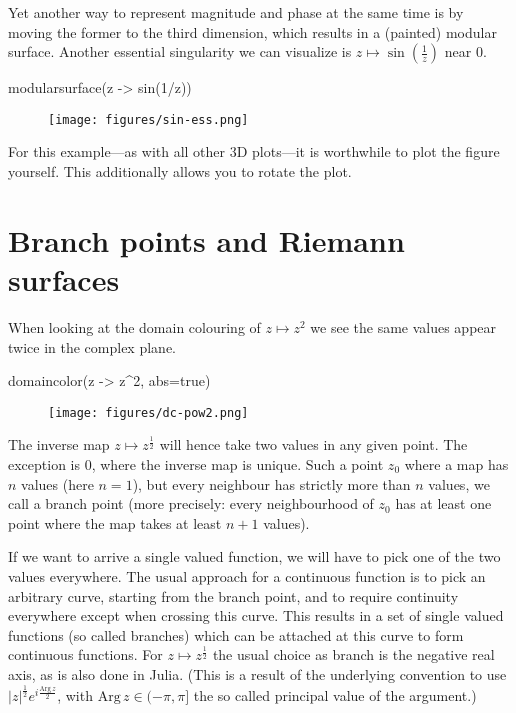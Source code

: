 \documentclass[a4paper]{article}
\begin{document}
Yet another way to represent magnitude and phase at the same time is by moving
the former to the third dimension, which results in a (painted) modular surface.
Another essential singularity we can visualize is
$z \mapsto \sin\left(\frac{1}{z}\right)$ near $0$.

\begin{juliaverbatim}
	modularsurface(z -> sin(1/z))
\end{juliaverbatim}
\begin{figure}[H]
	\centering
	\texttt{[image: figures/sin-ess.png]}
\end{figure}

For this example---as with all other 3D plots---it is worthwhile to plot the
figure yourself. This additionally allows you to rotate the plot.

\section{Branch points and Riemann surfaces}

When looking at the domain colouring of $z \mapsto z^2$ we see the same values
appear twice in the complex plane.

\begin{juliaverbatim}
	domaincolor(z -> z^2, abs=true)
\end{juliaverbatim}
\begin{figure}[H]
	\centering
	\texttt{[image: figures/dc-pow2.png]}
\end{figure}

The inverse map $z \mapsto z^{\frac{1}{2}}$ will hence take two values in any
given point. The exception is $0$, where the inverse map is unique. Such a
point $z_0$ where a map has $n$ values (here $n=1$), but every neighbour
has strictly more than $n$ values, we call a branch point (more precisely:
every neighbourhood of $z_0$ has at least one point where the map takes at
least $n+1$ values).

If we want to arrive a single valued function, we will have to pick one of the
two values everywhere. The usual approach for a continuous function is to pick
an arbitrary curve, starting from the branch point, and to require continuity
everywhere except when crossing this curve. This results in a set of single
valued functions (so called branches) which can be attached at this curve to
form continuous functions. For $z \mapsto z^\frac{1}{2}$ the usual choice as
branch is the negative real axis, as is also done in Julia. (This is a result of
the underlying convention to use
${|z|}^{{\frac{1}{2}}} e^{i \frac{\mathrm{Arg}\,z}{2}}$, with
$\mathrm{Arg}\,z \in (-\pi, \pi]$ the so called principal value of the
	argument.)
\end{document}
